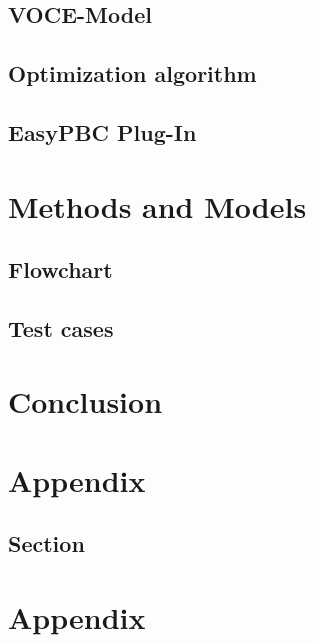 \documentclass[
		11pt,
		a4paper,
		titlepage=firstiscover,
	]{scrreprt}
\renewcommand{\headrulewidth}{0.4pt}
\renewcommand{\chaptermark}[1]{\markboth{\thechapter\ #1}{}}
\renewcommand{\sectionmark}[1]{\markright{\thesection\ #1}}
\renewcommand{\headrulewidth}{0pt}
\begin{document}
 

    
    
    \section{VOCE-Model}
    \section{Optimization algorithm}
    \section{EasyPBC Plug-In}

    \chapter{Methods and Models}
    \section{Flowchart}
    \section{Test cases}
    
    
    
    
    \chapter{Conclusion}
	

	
	
	
	\clearpage
	\newpage
	
	\pagestyle{fancy}
	\fancyhead{}
	\fancyfoot{}
	\fancyhead[R]{\rightmark}
	\renewcommand{\headrulewidth}{0.4pt}
	\fancyfoot[R]{\thepage}
	\renewcommand{\chaptermark}[1]{\markboth{\thechapter\ #1}{}}
	\renewcommand{\sectionmark}[1]{\markright{\thesection\ #1}}
	
	 \printbibliography[heading=bibintoc, title={Bibliography}]
	
	\newpage
	
	 \begin{appendices}
	 	\chapter{Appendix}
	 	\section{Section}
	 	\chapter{Appendix}
	\end{appendices}
	
	
\end{document}
